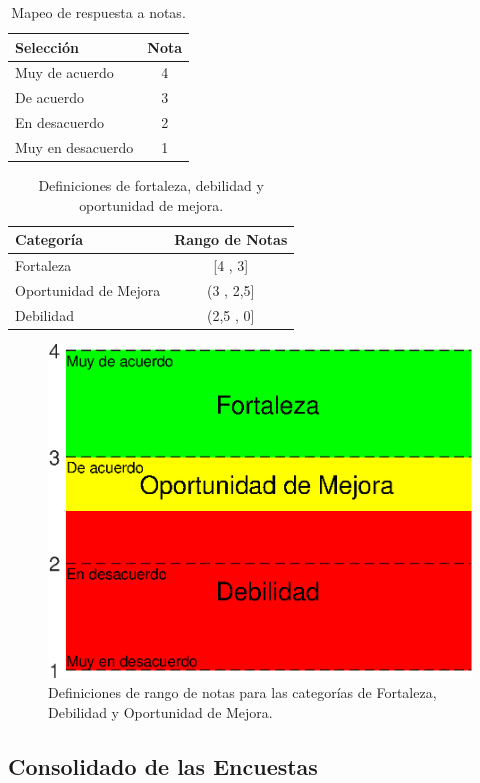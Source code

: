 \begin{table}[!ht]
\centering
\caption{Mapeo de respuesta a notas.}
\label{criterio_mapa}
\begin{tabular}{lc}
\hline
Selección         & Nota \\ \hline \hline
Muy de acuerdo    & 4    \\
De acuerdo        & 3    \\
En desacuerdo     & 2    \\
Muy en desacuerdo & 1    \\
\hline
\end{tabular}
\end{table}

\begin{table}[!ht]
\centering
\caption{Definiciones de fortaleza, debilidad y oportunidad de mejora.}
\label{criterio_definicion}
\begin{tabular}{lc}
\hline
Categoría             & Rango de Notas \\ \hline \hline
Fortaleza             & {[}4 , 3{]}    \\ 
Oportunidad de Mejora & (3 , 2,5{]}    \\ 
Debilidad             & (2,5 , 0{]}    \\ \hline
\end{tabular}
\end{table}

\begin{figure}[!ht]
\centering
\includegraphics[width=0.5\columnwidth]{./pictures/criterios.eps}
\caption{Definiciones de rango de notas para las categorías de Fortaleza, Debilidad y Oportunidad de Mejora.}
\label{criterios_fig}
\end{figure}




\subsection{Consolidado de las Encuestas}

